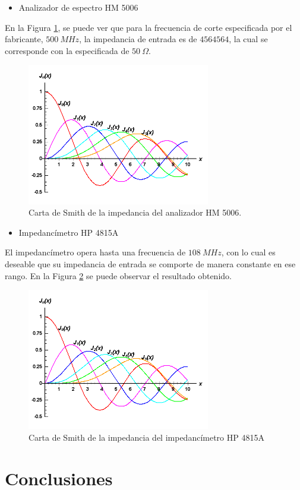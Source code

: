 \documentclass[a4paper,10pt]{article}
\begin{document}
		\begin{itemize}
			\item Analizador de espectro HM 5006
		\end{itemize}
		
		\indent En la Figura \ref*{tranferenciacHM}, se puede ver que para la 
		frecuencia de corte especificada por el fabricante, $500~MHz$, la 
		impedancia de entrada es de $4564564$, la cual se corresponde con la 
		especificada de $50~\Omega$.
		
		\begin{figure}[!htb]
			\centering
			\includegraphics[width=8cm]
			{Imagenes/bessel.png}
			\caption{Carta de Smith de la impedancia del analizador HM 5006.}
			\label{tranferenciacHM} 
		\end{figure}		
		\begin{itemize}
			\item Impedanc\'imetro HP 4815A
		\end{itemize}
		
		\indent El impedanc\'imetro opera hasta una frecuencia de $108~MHz$, con
		lo cual es deseable que su impedancia de entrada se comporte de manera 
		constante en ese rango. En la Figura 
		\ref*{tranferenciaimpedanciamiterro} se puede observar el resultado 
		obtenido.
		
		\begin{figure}[!htb]
			\centering
			\includegraphics[width=8cm]
			{Imagenes/bessel.png}
			\caption{Carta de Smith de la impedancia del impedanc\'imetro HP 
			4815A}
			\label{tranferenciaimpedanciamiterro} 
		\end{figure}		
	\section{Conclusiones}
	\indent
\end{document}
